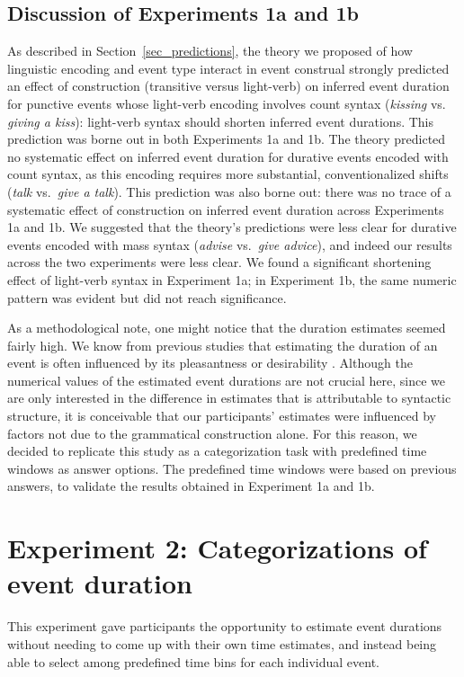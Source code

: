 \documentclass[preprint,12pt,authoryear]{elsarticle}
\begin{document}
\subsection{Discussion of Experiments 1a and 1b}\label{sec_discOE}
As described in Section~\ref{sec_predictions}, the theory we proposed of how linguistic encoding and event type interact in event construal strongly predicted an effect of construction (transitive versus light-verb) on inferred event duration for punctive events whose light-verb encoding involves count syntax (\emph{kissing} vs. \emph{giving a kiss}): light-verb syntax should shorten inferred event durations.  This prediction was borne out in both Experiments 1a and 1b.  The theory predicted no systematic effect on inferred event duration for durative events encoded with count syntax, as this encoding requires more substantial, conventionalized  shifts  (\emph{talk} vs.\ \emph{give a talk}).  This prediction was also borne out: there was no trace of a systematic effect of construction on inferred event duration across Experiments 1a and 1b.  We suggested that the theory's predictions were less clear for durative events encoded with mass syntax (\emph{advise} vs.\ \emph{give advice}), and indeed our results across the two experiments were less clear. We found a significant shortening effect of light-verb syntax in Experiment 1a; in Experiment 1b, the same numeric pattern was evident but did not reach significance.

As a methodological note, one might notice that the duration estimates seemed fairly high. We know from previous studies that estimating the duration of an event is often influenced by its pleasantness or desirability \citep{roy2005underestimating,kahneman1977intuitive}. Although the numerical values of the estimated event durations are not crucial here, since we are only interested in the difference in estimates that is attributable to syntactic structure, it is conceivable that our participants' estimates were influenced by factors not due to the grammatical construction alone. For this reason, we decided to replicate this study as a categorization task with predefined time windows as answer options. The predefined time windows were based on previous answers, to validate the results obtained in Experiment 1a and 1b. 

\section{Experiment 2: Categorizations of event duration}\label{sec_exCat}
This experiment gave participants the opportunity to estimate event durations without needing to come up with their own time estimates, and instead being able to select among predefined time bins for each individual event. 
\end{document}
